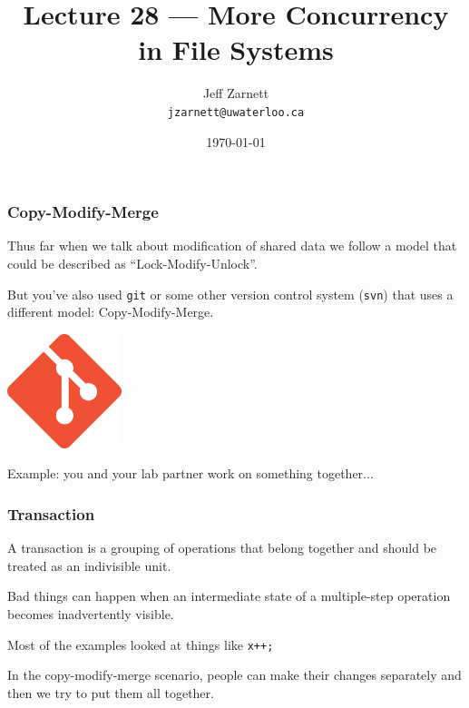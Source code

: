 

\title{Lecture 28 --- More Concurrency in File Systems }

\author{Jeff Zarnett \\ \small \texttt{jzarnett@uwaterloo.ca}}
\date{\today}




\begin{frame}
	\titlepage

\end{frame}


\begin{frame}
\frametitle{Copy-Modify-Merge}

Thus far when we talk about modification of shared data we follow a model that could be described as ``Lock-Modify-Unlock''. 

But you've also used \texttt{git} or some other version control system (\texttt{svn}) that uses a different model: Copy-Modify-Merge. 

\begin{center}
	\includegraphics[width=0.25\textwidth]{images/git.png}
\end{center}

Example: you and your lab partner work on something together...

\end{frame}


\begin{frame}
\frametitle{Transaction}

A \alert{transaction} is a grouping of operations that belong together and should be treated as an indivisible unit. 

Bad things can happen when an intermediate state of a multiple-step operation becomes inadvertently visible.

Most of the examples looked at things like \texttt{x++;}

In the copy-modify-merge scenario, people can make their changes separately and then we try to put them all together. 
 
\end{frame}

